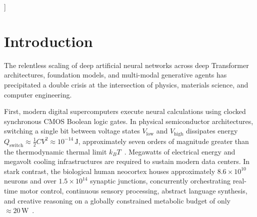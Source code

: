 \documentclass[10pt,twocolumn,3p]{article}
\begin{document}
\begin{@twocolumnfalse}
\begin{abstract}
    In PyTorch native implementation, we introduce Daleckii-Krein matrix spectral Fr\'echet derivatives with normalized \texttt{sinc} kernels to unconditionally bypass numerical division-by-zero singularities during autograd backpropagation. We provide empirical verification across eight comprehensive benchmarks, including live 1024-shot trapped-ion cloud API execution on IonQ hardware achieving a Bhattacharyya state fidelity of $\mathcal{F} = 0.999828$ and Pearson correlation $r = 0.997888$ via an optimal 2-pulse M\o lmer-S\o rensen compilation of continuous $XY$ resonance, dedicated validation of dialectical frontiers and contextuality saturation, and biophysical CSF shielding validation across clinical stress tests (meningitis, hydrocephalus, and lumbar puncture recovery). Finally, we present an exhaustive dialectical adversarial synthesis resolving the five foundational quantum brain questions (decoherence carrier, qubit capacity, quantum advantage, consensus collapse without external observers, and scaling to foundation models via the Entanglement Area Law and Matrix Product States with $\chi \le 16$).
    \end{abstract}
    \vspace{1.5em}
  \end{@twocolumnfalse}
]

\section{Introduction}
\label{sec:introduction}

The relentless scaling of deep artificial neural networks across deep Transformer architectures, foundation models, and multi-modal generative agents has precipitated a double crisis at the intersection of physics, materials science, and computer engineering. 

First, modern digital supercomputers execute neural calculations using clocked synchronous CMOS Boolean logic gates. In physical semiconductor architectures, switching a single bit between voltage states $V_{\text{low}}$ and $V_{\text{high}}$ dissipates energy $Q_{\text{switch}} \approx \frac{1}{2} C V^2 \approx 10^{-14}\,\text{J}$, approximately seven orders of magnitude greater than the thermodynamic thermal limit $k_B T$~\cite{landauer1961,bennett1982}. Megawatts of electrical energy and megavolt cooling infrastructures are required to sustain modern data centers. In stark contrast, the biological human neocortex houses approximately $8.6 \times 10^{10}$ neurons and over $1.5 \times 10^{14}$ synaptic junctions, concurrently orchestrating real-time motor control, continuous sensory processing, abstract language synthesis, and creative reasoning on a globally constrained metabolic budget of only $\approx 20\,\text{W}$~\cite{kass1988,friston2010}.
\end{document}
